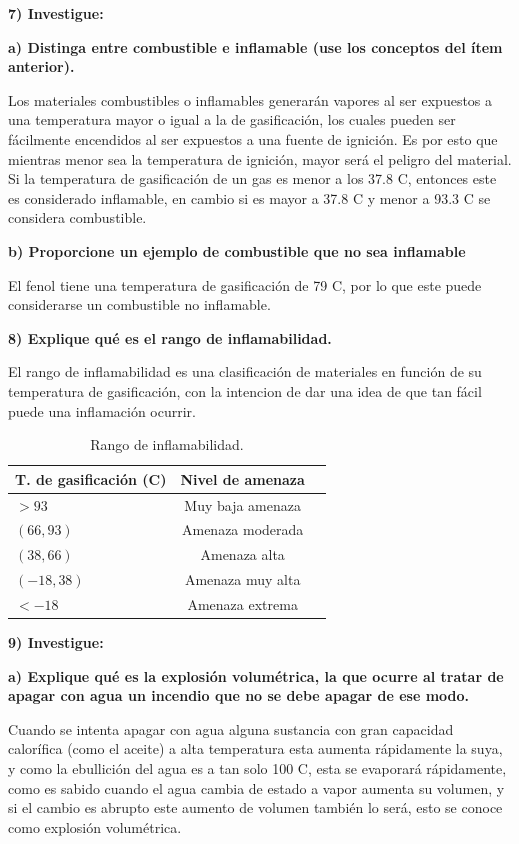 \documentclass[letterpaper,11pt]{article}
\begin{document}
\textbf{7) Investigue:}

\textbf{a) Distinga entre combustible e inflamable (use los conceptos del ítem
anterior).}

Los materiales combustibles o inflamables generarán vapores al ser expuestos a una temperatura mayor o igual a la de gasificación, los cuales pueden ser fácilmente encendidos al ser expuestos a una fuente de ignición. Es por esto que mientras menor sea la temperatura de ignición, mayor será el peligro del material. Si la temperatura de gasificación de un gas es menor a los 37.8 C, entonces este es considerado inflamable, en cambio si es mayor a 37.8 C y menor a 93.3 C se considera combustible.

\textbf{b) Proporcione un ejemplo de combustible que no sea inflamable}


El fenol tiene una temperatura de gasificación de 79 C, por lo que este puede considerarse un combustible no inflamable.

\textbf{8) Explique qué es el rango de inflamabilidad.}

El rango de inflamabilidad es una clasificación de materiales en función de su temperatura de gasificación, con la intencion de dar una idea de que tan fácil puede una inflamación ocurrir.

\begin{table}[h!]
	\begin{center}
		\caption{Rango de inflamabilidad.}
		\label{tab:table1}
		\begin{tabular}{l|c|r}
			T. de gasificación (C) & Nivel de amenaza\\
			\hline
			$>93$ & Muy baja amenaza \\
			$(66,93)$ & Amenaza moderada \\
			$(38,66)$ & Amenaza alta \\
			$(-18,38)$ & Amenaza muy alta \\
			$< -18$ & Amenaza extrema \\
		\end{tabular}
	\end{center}
\end{table}

\textbf{9) Investigue:}

\textbf{a) Explique qué es la explosión volumétrica, la que ocurre al tratar de apagar con agua un incendio que no se debe apagar de ese modo.}

Cuando se intenta apagar con agua alguna sustancia con gran capacidad calorífica (como el aceite) a alta temperatura esta aumenta rápidamente la suya, y como la ebullición del agua es a tan solo 100 C, esta se evaporará rápidamente, como es sabido cuando el agua cambia de estado a vapor aumenta su volumen, y si el cambio es abrupto este aumento de volumen también lo será, esto se conoce como explosión volumétrica.
\end{document}
